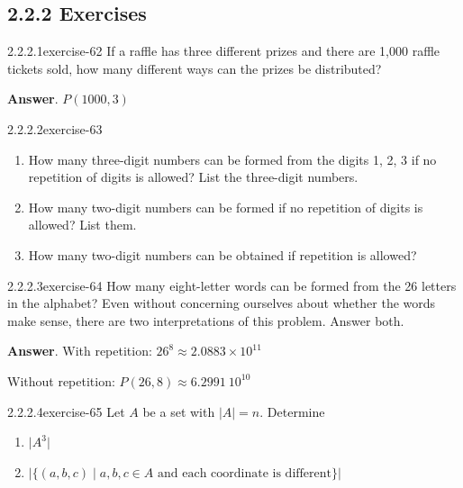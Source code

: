 \documentclass[twoside,10pt,]{book}
\numberwithin{equation}{section}
\begin{document}
\subsection*{2.2.2 Exercises}
\begin{divisionsolution}{2.2.2.1}{}{exercise-62}%
\hypertarget{p-665}{}%
If a raffle has three different prizes and there are 1,000 raffle tickets sold, how many different ways can the prizes be distributed?%
\par\smallskip%
\noindent\textbf{Answer}.\quad%
\hypertarget{p-666}{}%
\(P(1000,3)\)%
\end{divisionsolution}%
\begin{divisionsolution}{2.2.2.2}{}{exercise-63}%
\hypertarget{p-667}{}%
\leavevmode%
\begin{enumerate}[label=(\alph*)]
\item\hypertarget{li-421}{}How many three-digit numbers can be formed from the digits 1, 2, 3 if no repetition of digits is allowed? List the three-digit numbers.%
\item\hypertarget{li-422}{}How many two-digit numbers can be formed if no repetition of digits is allowed? List them.%
\item\hypertarget{li-423}{}How many two-digit numbers can be obtained if repetition is allowed?%
\end{enumerate}
%
\end{divisionsolution}%
\begin{divisionsolution}{2.2.2.3}{}{exercise-64}%
\hypertarget{p-668}{}%
How many eight-letter words can be formed from the 26 letters in the alphabet? Even without concerning ourselves about whether the words make sense, there are two interpretations of this problem. Answer both.%
\par\smallskip%
\noindent\textbf{Answer}.\quad%
\hypertarget{p-669}{}%
With repetition: \(26^8\approx  2.0883\times 10^{11}\)%
\par
\hypertarget{p-670}{}%
Without repetition: \(P(26,8) \approx 6.2991\ 10^{10}\)%
\end{divisionsolution}%
\begin{divisionsolution}{2.2.2.4}{}{exercise-65}%
\hypertarget{p-671}{}%
Let \(A\) be a set with \(\lvert A \rvert = n \). Determine%
\par
\hypertarget{p-672}{}%
\leavevmode%
\begin{enumerate}[label=(\alph*)]
\item\hypertarget{li-424}{}\hypertarget{p-673}{}%
\(\lvert A^3 \rvert \)%
\item\hypertarget{li-425}{}\hypertarget{p-674}{}%
\(\lvert \{ (a, b, c) \mid a, b, c \in A \textrm{ and each coordinate is different}\} \rvert \)%
\end{enumerate}
%
\end{divisionsolution}%
\end{document}
